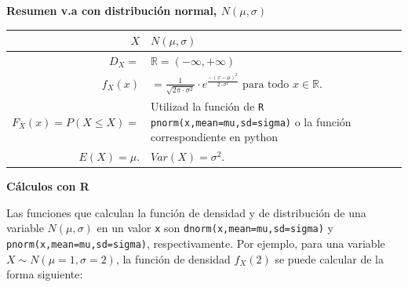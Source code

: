 \documentclass[]{book}
\begin{document}
\textbf{Resumen v.a con distribución normal, \(N(\mu,\sigma)\)}

\begin{longtable}[]{@{}rl@{}}
\toprule
\begin{minipage}[b]{0.38\columnwidth}\raggedleft
\(X\)\strut
\end{minipage} & \begin{minipage}[b]{0.56\columnwidth}\raggedright
\(N(\mu,\sigma)\)\strut
\end{minipage}\tabularnewline
\midrule
\endhead
\begin{minipage}[t]{0.38\columnwidth}\raggedleft
\(D_X=\)\strut
\end{minipage} & \begin{minipage}[t]{0.56\columnwidth}\raggedright
\(\mathbb{R}=(-\infty,+\infty)\)\strut
\end{minipage}\tabularnewline
\begin{minipage}[t]{0.38\columnwidth}\raggedleft
\(f_{X}(x)\)\strut
\end{minipage} & \begin{minipage}[t]{0.56\columnwidth}\raggedright
\(=\frac{1}{\sqrt{2\pi\cdot\sigma^2}}\cdot e^{\frac{-(x-\mu)^2}{2\cdot \sigma^2}}\mbox{ para todo }x\in \mathbb{R}.\)\strut
\end{minipage}\tabularnewline
\begin{minipage}[t]{0.38\columnwidth}\raggedleft
\(F_X(x)=P(X\leq X)=\)\strut
\end{minipage} & \begin{minipage}[t]{0.56\columnwidth}\raggedright
Utilizad la función de \texttt{R} \texttt{pnorm(x,mean=mu,sd=sigma)} o la función correspondiente en python\strut
\end{minipage}\tabularnewline
\begin{minipage}[t]{0.38\columnwidth}\raggedleft
\(E(X)=\mu.\)\strut
\end{minipage} & \begin{minipage}[t]{0.56\columnwidth}\raggedright
\(Var(X)=\sigma^2.\)\strut
\end{minipage}\tabularnewline
\bottomrule
\end{longtable}

\textbf{Cálculos con R}

Las funciones que calculan la función de densidad y de distribución de una variable \(N(\mu,\sigma)\) en un valor \texttt{x} son \texttt{dnorm(x,mean=mu,sd=sigma)} y \texttt{pnorm(x,mean=mu,sd=sigma)}, respectivamente. Por ejemplo, para una variable \(X\sim N(\mu=1,\sigma=2)\), la función de densidad \(f_X(2)\) se puede calcular de la forma siguiente:
\end{document}
